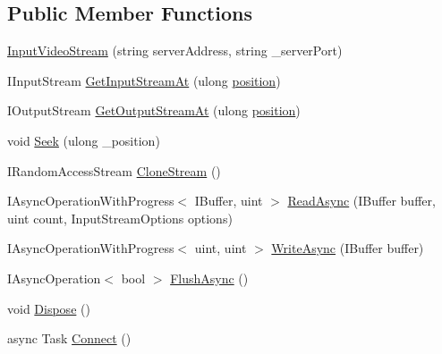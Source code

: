 \subsection*{Public Member Functions}
\begin{DoxyCompactItemize}
\item 
\hyperlink{class_e_l_i_client_1_1_input_video_stream_aeb09c4dec65a8619e609b66dc27e7b0c}{Input\+Video\+Stream} (string server\+Address, string \+\_\+server\+Port)
\item 
I\+Input\+Stream \hyperlink{class_e_l_i_client_1_1_input_video_stream_afc0e6cd66887bc975d7d188676616715}{Get\+Input\+Stream\+At} (ulong \hyperlink{class_e_l_i_client_1_1_input_video_stream_afa8afb29384563f3abc625defc4847a4}{position})
\item 
I\+Output\+Stream \hyperlink{class_e_l_i_client_1_1_input_video_stream_a03a67d8daf2056898db1f3d5a5cb24ae}{Get\+Output\+Stream\+At} (ulong \hyperlink{class_e_l_i_client_1_1_input_video_stream_afa8afb29384563f3abc625defc4847a4}{position})
\item 
void \hyperlink{class_e_l_i_client_1_1_input_video_stream_af6ad40c0bd8e0da1c0d185160e1f7067}{Seek} (ulong \+\_\+position)
\item 
I\+Random\+Access\+Stream \hyperlink{class_e_l_i_client_1_1_input_video_stream_aa61efafce04f69a274a8fa268b6bc80f}{Clone\+Stream} ()
\item 
I\+Async\+Operation\+With\+Progress$<$ I\+Buffer, uint $>$ \hyperlink{class_e_l_i_client_1_1_input_video_stream_a340ba3e2d2df24bcc4881af011c1a556}{Read\+Async} (I\+Buffer buffer, uint count, Input\+Stream\+Options options)
\item 
I\+Async\+Operation\+With\+Progress$<$ uint, uint $>$ \hyperlink{class_e_l_i_client_1_1_input_video_stream_a16dd12ce8ad7d0805b484ec11c646b3e}{Write\+Async} (I\+Buffer buffer)
\item 
I\+Async\+Operation$<$ bool $>$ \hyperlink{class_e_l_i_client_1_1_input_video_stream_adca4012402bc11d8608c7db75e805d02}{Flush\+Async} ()
\item 
void \hyperlink{class_e_l_i_client_1_1_input_video_stream_abd17d210dacc53836bb8f3de41483ae9}{Dispose} ()
\item 
async Task \hyperlink{class_e_l_i_client_1_1_input_video_stream_ad67ec2d0d414888dd58ac0adbd174645}{Connect} ()
\end{DoxyCompactItemize}
